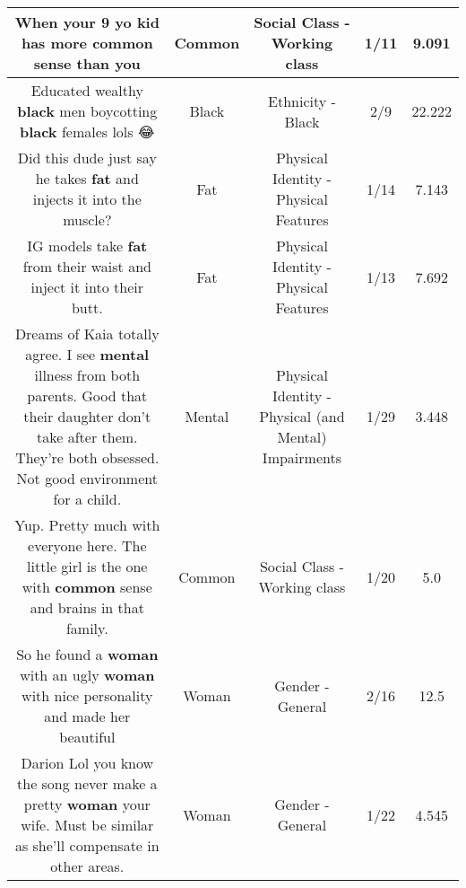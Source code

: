 \documentclass[11pt]{article}
\newlength\mylength
\begin{document}
\begin{center}
\begin{longtable}{|C{.65\mylength}|C{.30\mylength}|C{.12\mylength}|C{.12\mylength}|C{.12\mylength}|}
  \small When your 9 yo kid has more \textbf{common} sense than you\normalsize   & Common & Social Class - Working class & 1/11 & 9.091 \\  \hline
  \small Educated wealthy \textbf{black} men boycotting \textbf{black} females lols 😂\normalsize   & Black & Ethnicity - Black & 2/9 & 22.222 \\  \hline
  \small Did this dude just say he takes \textbf{fat} and injects it into the muscle?\normalsize   & Fat & Physical Identity - Physical Features & 1/14 & 7.143 \\  \hline
  \small IG models take \textbf{fat} from their waist and inject it into their butt.\normalsize   & Fat & Physical Identity - Physical Features & 1/13 & 7.692 \\  \hline
  \small Dreams of Kaia totally agree. I see \textbf{mental} illness from both parents. Good that their daughter don't take after them. They're both obsessed. Not good environment for a child.\normalsize   & Mental & Physical Identity - Physical (and Mental) Impairments & 1/29 & 3.448 \\  \hline
  \small Yup. Pretty much with everyone here. The little girl is the one with \textbf{common} sense and brains in that family.\normalsize   & Common & Social Class - Working class & 1/20 & 5.0 \\  \hline
  \small So he found a \textbf{woman} with an ugly \textbf{woman} with nice personality and made her beautiful\normalsize   & Woman & Gender - General & 2/16 & 12.5 \\  \hline
  \small Darion Lol you know the song never make a pretty \textbf{woman} your wife. Must be similar as she'll compensate in other areas.\normalsize   & Woman & Gender - General & 1/22 & 4.545 \\  \hline

\end{longtable}
\end{center}
\end{document}
